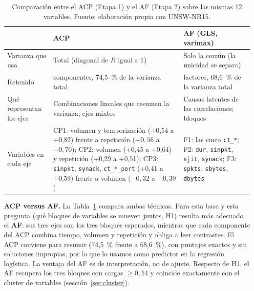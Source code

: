 \begin{table}[htbp]
  \centering
  \caption[Comparación entre ACP y AF]{Comparación entre el ACP (Etapa 1) y el AF (Etapa 2) sobre las mismas 12 variables. Fuente: elaboración propia con UNSW-NB15.}\label{tab:acp-af}
  \begin{tablacompacta}
  \begin{tabularx}{\linewidth}{@{}>{\raggedright\arraybackslash}p{2.5cm}>{\raggedright\arraybackslash}X>{\raggedright\arraybackslash}X@{}}
  \toprule
   & ACP & AF (GLS, varimax) \\
  \midrule
  Varianza que usa & Total (diagonal de $R$ igual a 1) & Solo la común (la unicidad se separa) \\
  Retenido & 3 componentes, 74,5~\% de la varianza total & 3 factores, 68,6~\% de la varianza total \\
  Qué representan los ejes & Combinaciones lineales que resumen la varianza; ejes mixtos & Causas latentes de las correlaciones; bloques \\
  Variables en cada eje & CP1: volumen y temporización (+0,54 a +0,82) frente a repetición ($-0{,}56$ a $-0{,}70$); CP2: volumen (+0,45 a +0,64) y repetición (+0,29 a +0,51); CP3: \texttt{sinpkt}, \texttt{synack}, \texttt{ct\_*\_port} (+0,41 a +0,59) frente a volumen ($-0{,}32$ a $-0{,}39$) & F1: las cinco \texttt{ct\_*}; F2: \texttt{dur}, \texttt{sinpkt}, \texttt{sjit}, \texttt{synack}; F3: \texttt{spkts}, \texttt{sbytes}, \texttt{dbytes} \\
  \bottomrule
  \end{tabularx}
  \end{tablacompacta}
\end{table}

\textbf{ACP versus AF.} La Tabla~\ref{tab:acp-af} compara ambas técnicas. Para esta base y esta pregunta (qué bloques de variables se mueven juntos, H1) resulta más adecuado el \textbf{AF}: sus tres ejes son los tres bloques esperados, mientras que cada componente del ACP combina tiempo, volumen y repetición y obliga a leer contrastes. El ACP conviene para resumir (74,5~\% frente a 68,6~\%), con puntajes exactos y sin soluciones impropias, por lo que lo usamos como predictor en la regresión logística. La ventaja del AF es de interpretación, no de ajuste. Respecto de H1, el AF recupera los tres bloques con cargas $\ge 0{,}54$ y coincide exactamente con el cluster de variables (sección~\ref{sec:cluster}).
